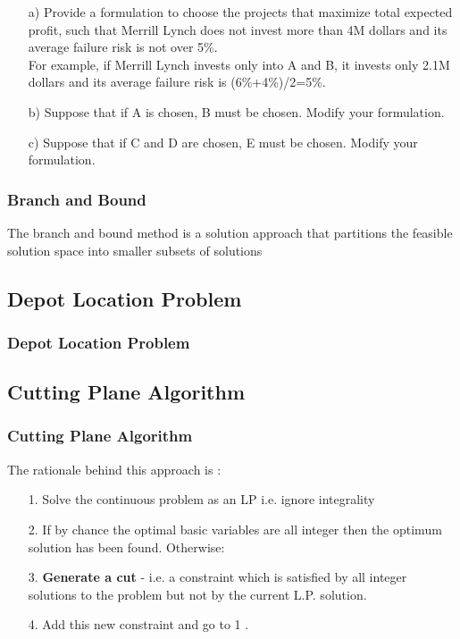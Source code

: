 \documentclass{beamer}
\begin{document}
\begin{frame}
\begin{itemize}
\item[a)]Provide a formulation to choose the projects that maximize total expected profit, such that Merrill
Lynch does not invest more than 4M dollars and its average failure risk is not over 5\%. \\ For example,
if Merrill Lynch invests only into A and B, it invests only 2.1M dollars and its average failure risk is
(6\%+4\%)/2=5\%.
\item[b)] Suppose that if A is chosen, B must be chosen. Modify your formulation.
\item[c)] Suppose that if C and D are chosen, E must be chosen. Modify your formulation.
\end{itemize} 
\end{frame}

\begin{frame}
	\frametitle{Branch and Bound}
\begin{framed}
The branch and bound method is a solution approach that partitions the feasible solution space into smaller subsets of solutions
\end{framed}
\end{frame}

\subsection{Depot Location Problem}
\begin{frame}
\frametitle{Depot Location Problem} %
\end{frame}
\subsection{Cutting Plane Algorithm}
\begin{frame}
	\frametitle{Cutting Plane Algorithm} 
The rationale behind this approach is :
\begin{itemize}
\item[1.] Solve the continuous problem as an LP i.e. ignore integrality
\item[2.] If by chance the optimal basic variables are all integer then the optimum solution has been found.
Otherwise:
\item[3.] \textbf{Generate a cut} - i.e. a constraint which is satisfied by all integer solutions to the problem but not by the 
current L.P. solution.
\item[4.] Add this new constraint and go to 1 .

\end{itemize}
\end{frame}
\end{document}
